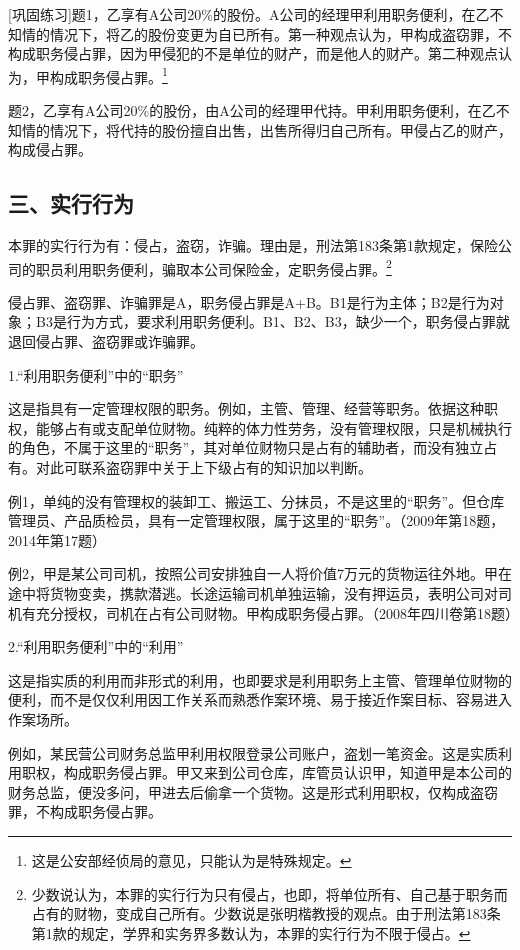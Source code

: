 [巩固练习]题1，乙享有A公司20\%的股份。A公司的经理甲利用职务便利，在乙不知情的情况下，将乙的股份变更为自已所有。第一种观点认为，甲构成盗窃罪，不构成职务侵占罪，因为甲侵犯的不是单位的财产，而是他人的财产。第二种观点认为，甲构成职务侵占罪。\footnote{这是公安部经侦局的意见，只能认为是特殊规定。}

题2，乙享有A公司20\%的股份，由A公司的经理甲代持。甲利用职务便利，在乙不知情的情况下，将代持的股份擅自出售，出售所得归自己所有。甲侵占乙的财产，构成侵占罪。

\subsection*{三、实行行为}

本罪的实行行为有：侵占，盗窃，诈骗。理由是，刑法第183条第1款规定，保险公司的职员利用职务便利，骗取本公司保险金，定职务侵占罪。\footnote{少数说认为，本罪的实行行为只有侵占，也即，将单位所有、自己基于职务而占有的财物，变成自己所有。少数说是张明楷教授的观点。由于刑法第183条第1款的规定，学界和实务界多数认为，本罪的实行行为不限于侵占。}

侵占罪、盗窃罪、诈骗罪是A，职务侵占罪是A+B。B1是行为主体；B2是行为对象；B3是行为方式，要求利用职务便利。B1、B2、B3，缺少一个，职务侵占罪就退回侵占罪、盗窃罪或诈骗罪。

1.“利用职务便利”中的“职务”

这是指具有一定管理权限的职务。例如，主管、管理、经营等职务。依据这种职权，能够占有或支配单位财物。纯粹的体力性劳务，没有管理权限，只是机械执行的角色，不属于这里的“职务”，其对单位财物只是占有的辅助者，而没有独立占有。对此可联系盗窃罪中关于上下级占有的知识加以判断。

例1，单纯的没有管理权的装卸工、搬运工、分抹员，不是这里的“职务”。但仓库管理员、产品质检员，具有一定管理权限，属于这里的“职务”。（2009年第18题，2014年第17题）

例2，甲是某公司司机，按照公司安排独自一人将价值7万元的货物运往外地。甲在途中将货物变卖，携款潜逃。长途运输司机单独运输，没有押运员，表明公司对司机有充分授权，司机在占有公司财物。甲构成职务侵占罪。（2008年四川卷第18题）

2.“利用职务便利”中的“利用”

这是指实质的利用而非形式的利用，也即要求是利用职务上主管、管理单位财物的便利，而不是仅仅利用因工作关系而熟悉作案环境、易于接近作案目标、容易进入作案场所。

例如，某民营公司财务总监甲利用权限登录公司账户，盗划一笔资金。这是实质利用职权，构成职务侵占罪。甲又来到公司仓库，库管员认识甲，知道甲是本公司的财务总监，便没多问，甲进去后偷拿一个货物。这是形式利用职权，仅构成盗窃罪，不构成职务侵占罪。

